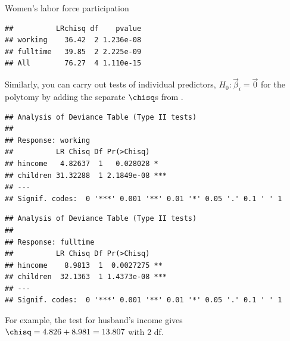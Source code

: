 \documentclass[11pt]{book}
\renewenvironment{knitrout}{\small\renewcommand{\baselinestretch}{.85}}{} %
\begin{document}
\begin{Example}[wlfpart1]{Women's labor force participation}
\begin{knitrout}
\color{fgcolor}\begin{kframe}
\begin{alltt}
 \hlkwb{<-} \hlstd{(}\hlstd{)}
  \hlstd{(}\hlopt{$} \hlopt{-} \hlopt{$}
          \hlopt{$} \hlopt{-} \hlopt{$}
 \hlkwb{<-} \hlstd{(}\hlstd{=}
             \hlstd{=}
 \hlkwb{<-}   \hlstd{=} 
 \hlkwb{<-}   \hlstd{=} \hlopt{-} \hlstd{(tab[,}\hlstd{], tab[,}\hlstd{]))}
\end{alltt}
\begin{verbatim}
##          LRchisq df    pvalue
## working    36.42  2 1.236e-08
## fulltime   39.85  2 2.225e-09
## All        76.27  4 1.110e-15
\end{verbatim}
\end{kframe}
\end{knitrout}

Similarly, you can carry out tests of individual predictors,
$H_0 : \vec{\beta}_i=\vec{0}$ for the polytomy by adding the separate
$\chisq$s from .

\begin{knitrout}
\color{fgcolor}\begin{kframe}
\begin{alltt}
\end{alltt}
\begin{verbatim}
## Analysis of Deviance Table (Type II tests)
## 
## Response: working
##          LR Chisq Df Pr(>Chisq)    
## hincome   4.82637  1   0.028028 *  
## children 31.32288  1 2.1849e-08 ***
## ---
## Signif. codes:  0 '***' 0.001 '**' 0.01 '*' 0.05 '.' 0.1 ' ' 1
\end{verbatim}
\begin{alltt}
\end{alltt}
\begin{verbatim}
## Analysis of Deviance Table (Type II tests)
## 
## Response: fulltime
##          LR Chisq Df Pr(>Chisq)    
## hincome    8.9813  1  0.0027275 ** 
## children  32.1363  1 1.4373e-08 ***
## ---
## Signif. codes:  0 '***' 0.001 '**' 0.01 '*' 0.05 '.' 0.1 ' ' 1
\end{verbatim}
\end{kframe}
\end{knitrout}
For example, the test for husband's income gives
$\chisq = 4.826 + 8.981 = 13.807$ with 2 df.



\end{Example}
\end{document}
